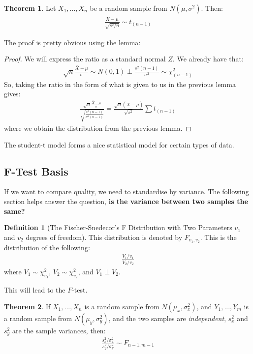 \documentclass[11pt]{scrartcl}
\theoremstyle{definition}
\newtheorem{theorem}{Theorem}
\newtheorem{definition}{Definition}
\theoremstyle{remark}
\begin{document}
\begin{theorem}
	Let $X_1, ..., X_n$ be a random sample from $N(\mu, \sigma^2)$. Then: 
	\begin{align*}
		\frac{\overline{X} - \mu}{\sqrt{ s^2/n} } \sim t_{(n-1)} 	
	\end{align*}
\end{theorem}
The proof is pretty obvious using the lemma: 
\begin{proof}
	We will express the ratio as a standard normal $Z$. We already have that: 
	\begin{align*}
		\sqrt{n} \frac{\overline{X} - \mu}{\sigma} \sim N(0,1) \perp \frac{s^2 (n-1)}{\sigma^2} \sim \chi^2_{(n-1)} 	
	\end{align*}
	So, taking the ratio in the form of what is given to us in the previous lemma gives: 
	\begin{align*}
		\frac{\sqrt{n} \frac{\overline{X} - \mu}{\sigma}}{\sqrt{\frac{s^2(n-1)}{\sigma^2 (n-1)}}} = \frac{\sqrt{n} (\overline{X} - \mu)}{\sqrt{s^2} } \sum t_{(n-1)} 
	\end{align*}
	where we obtain the distribution from the previous lemma. 
\end{proof}
The student-t model forms a nice statistical model for certain types of data. 

\subsection{F-Test Basis}

If we want to compare quality, we need to standardise by variance. The following section helps answer the question, \textbf{is the variance between two samples the same?}

\begin{definition}[The Fischer-Snedecor's F Distribution with Two Parameters $v_1$ and $v_2$ degrees of freedom] This distribution is denoted by $F_{v_1, v_2} $. This is the distribution of the following: 
\begin{align*}
	\frac{V_1 / v_1}{V_2/v_2}	
\end{align*}
	where $V_1 \sim \chi_{v_1}^2$, $V_2 \sim \chi_{v_2}^2$, and $V_1 \perp V_2$. 
\end{definition}

This will lead to the $F$-test. 

\begin{theorem}
	If $X_1, ..., X_n$ is a random sample from $N(\mu_x, \sigma_x^2)$, and $Y_1, ..., Y_m$ is a random sample from $N(\mu_y, \sigma^2_y)$, and the two samples are \emph{independent}, $s_x^2$ and $s_y^2$ are the sample variances, then: 
	\begin{align*}
		\frac{s^2_x / \sigma^2_x}{s^2_y / \sigma^2_y }	 \sim F_{n-1, m-1} 
	\end{align*}
\end{theorem}
\end{document}
